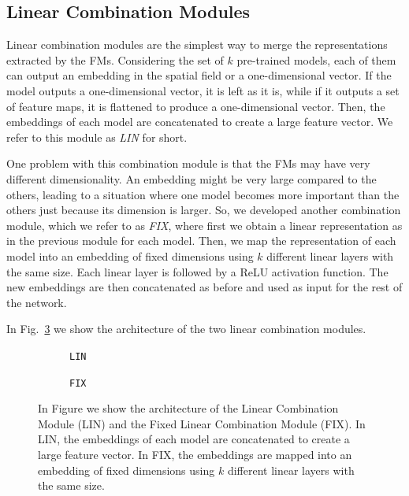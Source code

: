 \subsection{Linear Combination Modules}
\label{subsec:linear_combination}
Linear combination modules are the simplest way to merge the representations extracted by the FMs.
Considering the set of $k$ pre-trained models, each of them can output an embedding in the spatial field or a one-dimensional vector.
If the model outputs a one-dimensional vector, it is left as it is, while if it outputs a set of feature maps, it is flattened to produce a one-dimensional vector.
Then, the embeddings of each model are concatenated to create a large feature vector.
We refer to this module as \textit{LIN} for short.


One problem with this combination module is that the FMs may have very different dimensionality.
An embedding might be very large compared to the others, leading to a situation where one model becomes more important than the others just because its dimension is larger.
So, we developed another combination module, which we refer to as \textit{FIX}, where first we obtain a linear representation as in the previous module for each model.
Then, we map the representation of each model into an embedding of fixed dimensions using $k$ different linear layers with the same size.
Each linear layer is followed by a ReLU activation function.
The new embeddings are then concatenated as before and used as input for the rest of the network.

In Fig.~\ref{fig:lin_combination} we show the architecture of the two linear combination modules.


\begin{figure}[ht]
    \centering
    \begin{subfigure}[b]{0.47\textwidth}
        \centering
        \fbox{\rule[-.5cm]{0cm}{4cm} \rule[-.5cm]{4cm}{0cm}}
        \caption{\texttt{LIN}}
        \label{fig:lin}
    \end{subfigure}
    \hfill
    \begin{subfigure}[b]{0.47\textwidth}
        \centering
        \fbox{\rule[-.5cm]{0cm}{4cm} \rule[-.5cm]{4cm}{0cm}}
        \caption{\texttt{FIX}}
        \label{fig:fix_lin}
    \end{subfigure}

    \caption{In Figure we show the architecture of the Linear Combination Module (LIN) and the Fixed Linear Combination Module (FIX). In LIN, the embeddings of each model are concatenated to create a large feature vector. In FIX, the embeddings are mapped into an embedding of fixed dimensions using $k$ different linear layers with the same size.}
    \label{fig:lin_combination}
\end{figure}




